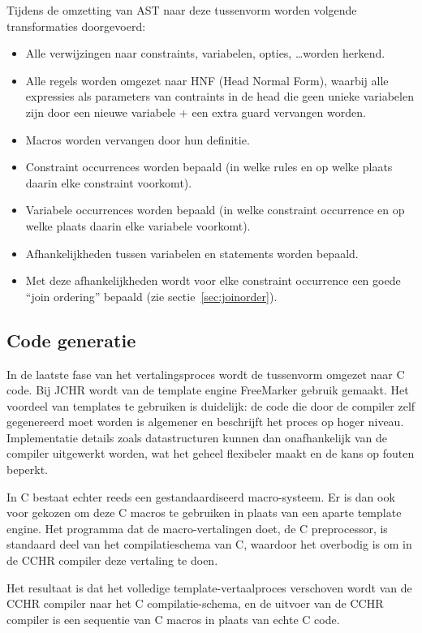 Tijdens de omzetting van AST naar deze tussenvorm worden volgende transformaties doorgevoerd: \begin{itemize}
\item Alle verwijzingen naar constraints, variabelen, opties, \ldots worden herkend.
\item Alle regels worden omgezet naar HNF (Head Normal Form), waarbij alle expressies als parameters van contraints in de head die geen unieke variabelen zijn door een nieuwe variabele + een extra guard vervangen worden.
\item Macros worden vervangen door hun definitie.
\item Constraint occurrences worden bepaald (in welke rules en op welke plaats daarin elke constraint voorkomt).
\item Variabele occurrences worden bepaald (in welke constraint occurrence en op welke plaats daarin elke variabele voorkomt).
\item Afhankelijkheden tussen variabelen en statements worden bepaald.
\item Met deze afhankelijkheden wordt voor elke constraint occurrence een goede ``join ordering'' bepaald (zie sectie~\ref{sec:joinorder}).
\end{itemize}

\subsection{Code generatie} \label{sec:codegen}

In de laatste fase van het vertalingsproces wordt de tussenvorm omgezet naar C code. Bij JCHR wordt van de template engine FreeMarker gebruik gemaakt. Het voordeel van templates te gebruiken is duidelijk: de code die door de compiler zelf gegenereerd moet worden is algemener en beschrijft het proces op hoger niveau. Implementatie details zoals datastructuren kunnen dan onafhankelijk van de compiler uitgewerkt worden, wat het geheel flexibeler maakt en de kans op fouten beperkt.

In C bestaat echter reeds een gestandaardiseerd macro-systeem. Er is dan ook voor gekozen om deze C macros te gebruiken in plaats van een aparte template engine. Het programma dat de macro-vertalingen doet, de C preprocessor, is standaard deel van het compilatieschema van C, waardoor het overbodig is om in de CCHR compiler deze vertaling te doen.

Het resultaat is dat het volledige template-vertaalproces verschoven wordt van de CCHR compiler naar het C compilatie-schema, en de uitvoer van de CCHR compiler is een sequentie van C macros in plaats van echte C code.

